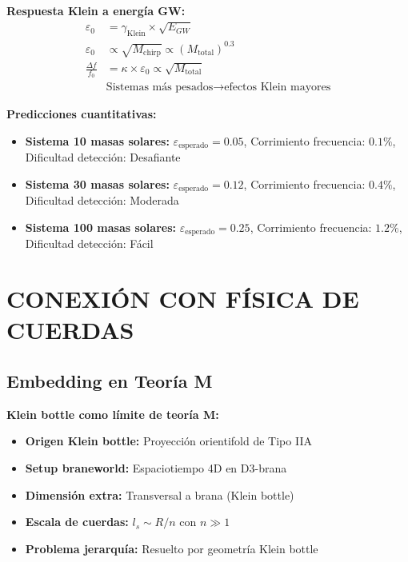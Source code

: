 \documentclass[12pt,a4paper]{article}
\begin{document}
\textbf{Respuesta Klein a energía GW:}
\begin{align}
\varepsilon_0 &= \gamma_{\text{Klein}} \times \sqrt{E_{GW}}\\
\varepsilon_0 &\propto \sqrt{M_{\text{chirp}}} \propto (M_{\text{total}})^{0.3}\\
\frac{\Delta f}{f_0} &= \kappa \times \varepsilon_0 \propto \sqrt{M_{\text{total}}}\\
&\text{Sistemas más pesados} \rightarrow \text{efectos Klein mayores}
\end{align}

\textbf{Predicciones cuantitativas:}

\begin{itemize}
\item \textbf{Sistema 10 masas solares:} $\varepsilon_{\text{esperado}} = 0.05$, Corrimiento frecuencia: $0.1\%$, Dificultad detección: Desafiante
\item \textbf{Sistema 30 masas solares:} $\varepsilon_{\text{esperado}} = 0.12$, Corrimiento frecuencia: $0.4\%$, Dificultad detección: Moderada
\item \textbf{Sistema 100 masas solares:} $\varepsilon_{\text{esperado}} = 0.25$, Corrimiento frecuencia: $1.2\%$, Dificultad detección: Fácil
\end{itemize}

\section{CONEXIÓN CON FÍSICA DE CUERDAS}

\subsection{Embedding en Teoría M}

\textbf{Klein bottle como límite de teoría M:}
\begin{itemize}
\item \textbf{Origen Klein bottle:} Proyección orientifold de Tipo IIA
\item \textbf{Setup braneworld:} Espaciotiempo 4D en D3-brana
\item \textbf{Dimensión extra:} Transversal a brana (Klein bottle)
\item \textbf{Escala de cuerdas:} $l_s \sim R/n$ con $n \gg 1$
\item \textbf{Problema jerarquía:} Resuelto por geometría Klein bottle
\end{itemize}
\end{document}
